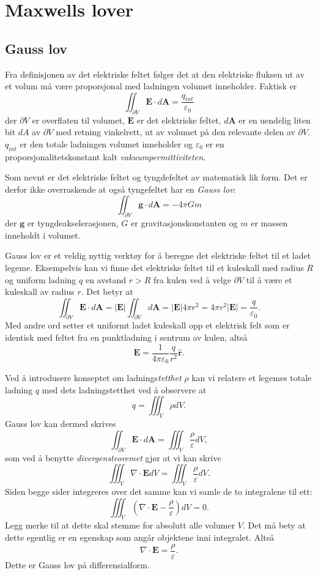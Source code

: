 \documentclass[twoside,utf8]{article}
\begin{document}
\section{Maxwells lover}
\subsection{Gauss lov}

Fra definisjonen av det elektriske feltet følger det at den elektriske fluksen ut av et volum må være proporsjonal med ladningen volumet inneholder. Faktisk er
$$
\iint _{\partial V} \mathbf{E}\cdot d\mathbf{A} = \frac{q_{int}}{\varepsilon_0}
$$
der $\partial V$ er overflaten til volumet, $\mathbf{E}$ er det elektriske feltet, $d\mathbf{A}$ er en uendelig liten bit $dA$ av $\partial V$ med retning vinkelrett, ut av volumet på den relevante delen av $\partial V$. $q_{int}$ er den totale ladningen volumet inneholder og $\varepsilon_0$ er en proporsjonalitetskonstant kalt {\it vakuumpermittiviteten}.


  Som nevnt er det elektriske feltet og tyngdefeltet av matematisk lik form. Det er derfor ikke overraskende at også tyngefeltet har en {\it Gauss lov}:
  $$
  \iint _{\partial V} \mathbf{g}\cdot d\mathbf{A} = -4 \pi G m
  $$
  der $\mathbf{g}$ er tyngdeakselerasjonen, $G$ er gravitasjonskonstanten og $m$ er massen inneholdt i volumet.



  Gauss lov er et veldig nyttig verktøy for å beregne det elektriske feltet til et ladet legeme. Eksempelvis kan vi finne det elektriske feltet til et kuleskall med radius $R$ og uniform ladning $q$ en avstand $r>R$ fra kulen ved å velge $\partial V$ til å være et kuleskall av radius $r$. Det betyr at
  $$
  \iint _{\partial V} \mathbf{E}\cdot d\mathbf{A}
  =
  |\mathbf{E}| \iint _{\partial V} d\mathbf{A}
  =
  |\mathbf{E}| 4\pi r^2
  =
  4 \pi r^2 |\mathbf{E}|
  =
  \frac{q}{\varepsilon_0}.
  $$
  Med andre ord setter et uniformt ladet kuleskall opp et elektrisk felt som er identisk med feltet fra en punktladning i sentrum av kulen, altså
  $$
  \mathbf{E} = \frac{1}{4\pi \varepsilon_0} \frac{q}{r^2}\hat{\mathbf{r}}.
  $$




  Ved å introdusere konseptet om ladnings{\it tetthet} $\rho$ kan vi relatere et legemes totale ladning $q$ med dets ladningstetthet ved å observere at
  $$
  q = \iiint_V \rho dV.
  $$
  Gauss lov kan dermed skrives
  $$
  \iint_{\partial V} \mathbf{E}\cdot d\mathbf{A} = \iiint_V \frac{\rho}{\varepsilon} dV,
  $$
  som ved å benytte {\it divergensteoremet} gjør at vi kan skrive
  $$
  \iiint_{V} \nabla \cdot \mathbf{E} dV = \iiint_V \frac{\rho}{\varepsilon} dV.
  $$
  Siden begge sider integreres over det samme kan vi samle de to integralene til ett:
  $$
  \iiint_{V} \left( \nabla \cdot \mathbf{E} - \frac{\rho}{\varepsilon} \right)dV=0.
  $$
  Legg merke til at dette skal stemme for absolutt alle volumer $V$. Det må bety at dette egentlig er en egenskap som angår objektene inni integralet. Altså
  $$
  \nabla \cdot \mathbf{E} = \frac{\rho}{\varepsilon}.
  $$
  Dette er Gauss lov på differensialform.
\end{document}
